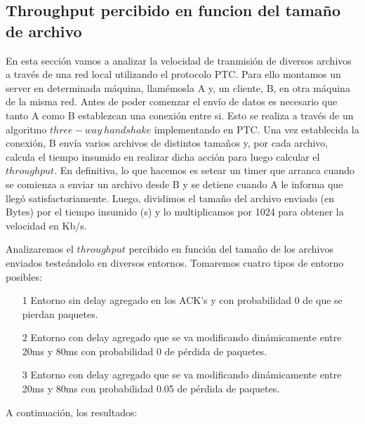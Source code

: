 \subsection{Throughput percibido en funcion del tamaño de archivo}

En esta sección vamos a analizar la velocidad de tranmisión de diversos archivos a través de una red local utilizando el protocolo PTC. Para ello montamos un server en determinada máquina, llamémosla A y, un cliente, B, en otra máquina de la misma red. Antes de poder comenzar el envío de datos es necesario que tanto A como B establezcan una conexión entre si. Esto se realiza a través de un algoritmo $three-way \ handshake$ implementando en PTC. Una vez establecida la conexión, B envía varios archivos de distintos tamaños y, por cada archivo, calcula el tiempo insumido en realizar dicha acción para luego calcular el $throughput$. En definitiva, lo que hacemos es setear un timer que arranca cuando se comienza a enviar un archivo desde B y se detiene cuando A le informa que llegó satisfactoriamente. Luego, dividimos el tamaño del archivo enviado (en Bytes) por el tiempo insumido (s) y lo multiplicamos por 1024 para obtener la velocidad en Kb/s.

Analizaremos el $throughput$ percibido en función del tamaño de los archivos enviados testeándolo en diversos entornos. Tomaremos cuatro tipos de entorno posibles:
\begin{itemize}
	\item[1] Entorno sin delay agregado en los ACK's y con probabilidad 0 de que se pierdan paquetes.
	\item[2] Entorno con delay agregado que se va modificando dinámicamente entre 20ms y 80ms con probabilidad 0 de pérdida de paquetes.
	\item[3] Entorno con delay agregado que se va modificando dinámicamente entre 20ms y 80ms con probabilidad 0.05 de pérdida de paquetes.
\end{itemize}

A continuación, los resultados:

